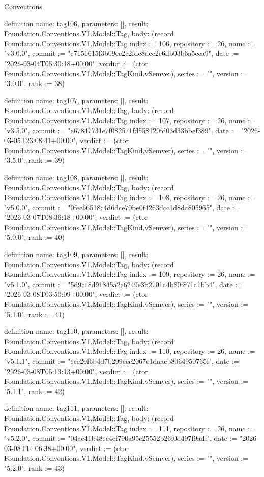 \begin{lexlean}{Conventions}
\begin{semanticmodule}
definition{
  name: tag106,
  parameters: [],
  result: Foundation.Conventions.V1.Model::Tag,
  body: (record Foundation.Conventions.V1.Model::Tag {index := 106, repository := 26, name := "v3.0.0", commit := "c7151615f3b09ce2c2fde8dec2c6db03b6a5eca9", date := "2026-03-04T05:30:18+00:00", verdict := (ctor Foundation.Conventions.V1.Model::TagKind.vSemver), series := "", version := "3.0.0", rank := 38})
}

definition{
  name: tag107,
  parameters: [],
  result: Foundation.Conventions.V1.Model::Tag,
  body: (record Foundation.Conventions.V1.Model::Tag {index := 107, repository := 26, name := "v3.5.0", commit := "e67847731e7f082571fd558120fd03d33bbef389", date := "2026-03-05T23:08:41+00:00", verdict := (ctor Foundation.Conventions.V1.Model::TagKind.vSemver), series := "", version := "3.5.0", rank := 39})
}

definition{
  name: tag108,
  parameters: [],
  result: Foundation.Conventions.V1.Model::Tag,
  body: (record Foundation.Conventions.V1.Model::Tag {index := 108, repository := 26, name := "v5.0.0", commit := "0fee66518c4d6dce70be0f4263dcc1d8da805965", date := "2026-03-07T08:36:18+00:00", verdict := (ctor Foundation.Conventions.V1.Model::TagKind.vSemver), series := "", version := "5.0.0", rank := 40})
}

definition{
  name: tag109,
  parameters: [],
  result: Foundation.Conventions.V1.Model::Tag,
  body: (record Foundation.Conventions.V1.Model::Tag {index := 109, repository := 26, name := "v5.1.0", commit := "5d9cc8d91845a2e6249e3b2701a4b80f871a1bb4", date := "2026-03-08T03:50:09+00:00", verdict := (ctor Foundation.Conventions.V1.Model::TagKind.vSemver), series := "", version := "5.1.0", rank := 41})
}

definition{
  name: tag110,
  parameters: [],
  result: Foundation.Conventions.V1.Model::Tag,
  body: (record Foundation.Conventions.V1.Model::Tag {index := 110, repository := 26, name := "v5.1.1", commit := "ece20f6b4d7b299eec2067e1daacb8064950765f", date := "2026-03-08T05:13:13+00:00", verdict := (ctor Foundation.Conventions.V1.Model::TagKind.vSemver), series := "", version := "5.1.1", rank := 42})
}

definition{
  name: tag111,
  parameters: [],
  result: Foundation.Conventions.V1.Model::Tag,
  body: (record Foundation.Conventions.V1.Model::Tag {index := 111, repository := 26, name := "v5.2.0", commit := "04ae41b48ec4cf790a95c25552b26f0d497f9adf", date := "2026-03-08T14:06:38+00:00", verdict := (ctor Foundation.Conventions.V1.Model::TagKind.vSemver), series := "", version := "5.2.0", rank := 43})
}


\end{semanticmodule}
\end{lexlean}
